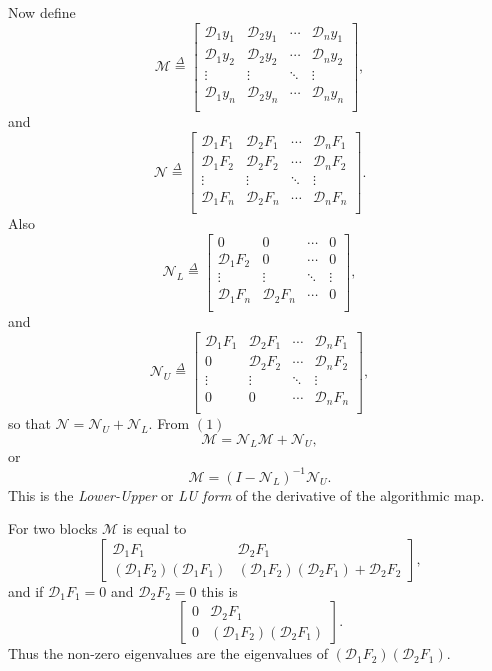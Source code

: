 \documentclass[
  12pt,
]{book}
\begin{document}
Now define
\[
\mathcal{M}\mathop{=}\limits^{\Delta}
\begin{bmatrix}
\mathcal{D}_1y_1&\mathcal{D}_2y_1&\cdots&\mathcal{D}_ny_1\\
\mathcal{D}_1y_2&\mathcal{D}_2y_2&\cdots&\mathcal{D}_ny_2\\
\vdots&\vdots&\ddots&\vdots\\
\mathcal{D}_1y_n&\mathcal{D}_2y_n&\cdots&\mathcal{D}_ny_n\\
\end{bmatrix},
\]
and
\[
\mathcal{N}\mathop{=}\limits^{\Delta}
\begin{bmatrix}
\mathcal{D}_1F_1&\mathcal{D}_2F_1&\cdots&\mathcal{D}_nF_1\\
\mathcal{D}_1F_2&\mathcal{D}_2F_2&\cdots&\mathcal{D}_nF_2\\
\vdots&\vdots&\ddots&\vdots\\
\mathcal{D}_1F_n&\mathcal{D}_2F_n&\cdots&\mathcal{D}_nF_n\\
\end{bmatrix}.
\]
Also
\[
\mathcal{N}_L\mathop{=}\limits^{\Delta}
\begin{bmatrix}
0&0&\cdots&0\\
\mathcal{D}_1F_2&0&\cdots&0\\
\vdots&\vdots&\ddots&\vdots\\
\mathcal{D}_1F_n&\mathcal{D}_2F_n&\cdots&0\\
\end{bmatrix},
\]
and
\[
\mathcal{N}_U\mathop{=}\limits^{\Delta}
\begin{bmatrix}
\mathcal{D}_1F_1&\mathcal{D}_2F_1&\cdots&\mathcal{D}_nF_1\\
0&\mathcal{D}_2F_2&\cdots&\mathcal{D}_nF_2\\
\vdots&\vdots&\ddots&\vdots\\
0&0&\cdots&\mathcal{D}_nF_n\\
\end{bmatrix},
\]
so that \(\mathcal{N}=\mathcal{N}_U+\mathcal{N}_L\). From \((1)\)
\[
\mathcal{M}=\mathcal{N}_L\mathcal{M}+\mathcal{N}_U,
\]
or
\[
\mathcal{M}=(I-\mathcal{N}_L)^{-1}\mathcal{N}_U.
\]
This is the \emph{Lower-Upper} or \emph{LU form} of the derivative of the algorithmic map.

For two blocks \(\mathcal{M}\) is equal to
\[
\begin{bmatrix}
\mathcal{D}_1F_1&\mathcal{D}_2F_1\\
(\mathcal{D}_1F_2)(\mathcal{D}_1F_1)&(\mathcal{D}_1F_2)(\mathcal{D}_2F_1)+\mathcal{D}_2F_2
\end{bmatrix},
\]
and if \(\mathcal{D}_1F_1=0\) and \(\mathcal{D}_2F_2=0\) this is
\[
\begin{bmatrix}
0&\mathcal{D}_2F_1\\
0&(\mathcal{D}_1F_2)(\mathcal{D}_2F_1)
\end{bmatrix}.
\]
Thus the non-zero eigenvalues are the eigenvalues of \((\mathcal{D}_1F_2)(\mathcal{D}_2F_1)\).
\end{document}
